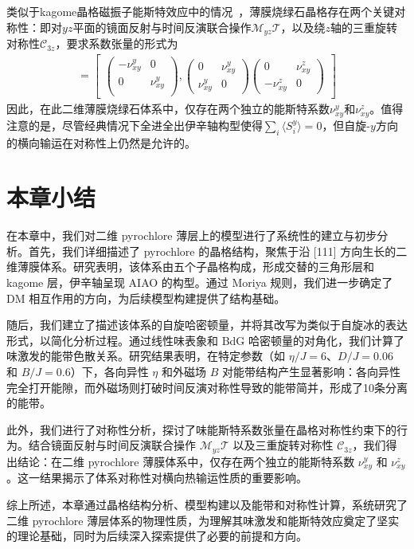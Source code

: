         类似于kagome晶格磁振子能斯特效应中的情况~\cite{li2020intrinsic}，薄膜烧绿石晶格存在两个关键对称性：即对$yz$平面的镜面反射与时间反演联合操作$\mathcal{M}_{yz} \mathcal{T}$，以及绕$z$轴的三重旋转对称性$\mathcal{C}_{3z}$，要求系数张量的形式为
        \begin{align}
        [\nu^x\!,\nu^y\!,\nu^z]=\begin{bmatrix}
            \begin{pmatrix}
                -\nu^y_{xy}     & 0\\
                0                  & \nu^y_{xy}\\
            \end{pmatrix}\!,\begin{pmatrix}
                0                  & \nu^y_{xy}\\
                \nu^{y}_{xy}    & 0
            \end{pmatrix}\!\begin{pmatrix}
                0                  & \nu^z_{xy}\\
                -\nu^z_{xy}     & 0
            \end{pmatrix}
        \end{bmatrix}
        \end{align}
        因此，在此二维薄膜烧绿石体系中，仅存在两个独立的能斯特系数$\nu^y_{xy}$和$\nu^z_{xy}$。值得注意的是，尽管经典情况下全进全出伊辛轴构型使得$\sum_i\langle S_i^y \rangle=0$，但自旋-$y$方向的横向输运在对称性上仍然是允许的。
        
    \section{本章小结}

    在本章中，我们对二维 pyrochlore 薄层上的模型进行了系统性的建立与初步分析。首先，我们详细描述了 pyrochlore 的晶格结构，聚焦于沿 [111] 方向生长的二维薄膜体系。研究表明，该体系由五个子晶格构成，形成交替的三角形层和 kagome 层，伊辛轴呈现 AIAO 的构型。通过 Moriya 规则，我们进一步确定了 DM 相互作用的方向，为后续模型构建提供了结构基础。

    随后，我们建立了描述该体系的自旋哈密顿量，并将其改写为类似于自旋冰的表达形式，以简化分析过程。通过线性味表象和 BdG 哈密顿量的对角化，我们计算了味激发的能带色散关系。研究结果表明，在特定参数（如 $\eta/J = 6$、$D/J = 0.06$ 和 $B/J = 0.6$）下，各向异性 $\eta$ 和外磁场 $B$ 对能带结构产生显著影响：各向异性完全打开能隙，而外磁场则打破时间反演对称性导致的能带简并，形成了10条分离的能带。

    此外，我们进行了对称性分析，探讨了味能斯特系数张量在晶格对称性约束下的行为。结合镜面反射与时间反演联合操作 $\mathcal{M}_{yz} \mathcal{T}$ 以及三重旋转对称性 $\mathcal{C}_{3z}$，我们得出结论：在二维 pyrochlore 薄膜体系中，仅存在两个独立的能斯特系数 $\nu^y_{xy}$ 和 $\nu^z_{xy}$。这一结果揭示了体系对称性对横向热输运性质的重要影响。

    综上所述，本章通过晶格结构分析、模型构建以及能带和对称性计算，系统研究了二维 pyrochlore 薄层体系的物理性质，为理解其味激发和能斯特效应奠定了坚实的理论基础，同时为后续深入探索提供了必要的前提和方向。